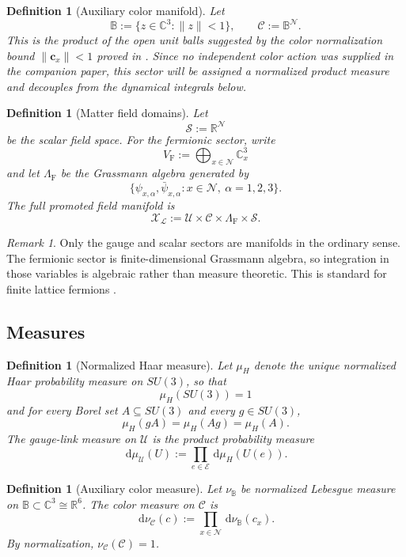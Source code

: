 \documentclass[11pt]{article}
\newtheorem{definition}[theorem]{Definition}
\theoremstyle{remark}
\newtheorem{remark}[theorem]{Remark}
\newcommand{\R}{\mathbb R}
\newcommand{\C}{\mathbb C}
\newcommand{\mcN}{\mathcal N}
\newcommand{\mcE}{\mathcal E}
\newcommand{\mcU}{\mathscr U}
\newcommand{\mcCaux}{\mathscr C}
\newcommand{\mcS}{\mathscr S}
\newcommand{\mcX}{\mathscr X}
\newcommand{\bbB}{\mathbb B}
\newcommand{\dd}{\,\mathrm d}
\begin{document}
\begin{definition}[Auxiliary color manifold]
\label{def:color-manifold}
Let
\[
\bbB:=\{z\in\C^3:\|z\|<1\},
\qquad
\mcCaux:=\bbB^{\mcN}.
\]
This is the product of the open unit balls suggested by the color normalization
bound $\|\mathbf c_x\|<1$ proved in \cite{continuumqft}.  Since no independent
color action was supplied in the companion paper, this sector will be assigned
a normalized product measure and decouples from the dynamical integrals below.
\end{definition}

\begin{definition}[Matter field domains]
\label{def:matter-domains}
Let
\[
\mcS:=\R^{\mcN}
\]
be the scalar field space.  For the fermionic sector, write
\[
V_{\mathrm F}:=\bigoplus_{x\in\mcN}\C_x^3
\]
and let $\Lambda_{\mathrm F}$ be the Grassmann algebra generated by
\[
\{\psi_{x,\alpha},\bar\psi_{x,\alpha}:x\in\mcN,\ \alpha=1,2,3\}.
\]
The full promoted field manifold is
\[
\mcX_\mathcal L:=\mcU\times\mcCaux\times \Lambda_{\mathrm F}\times\mcS.
\]
\end{definition}

\begin{remark}
Only the gauge and scalar sectors are manifolds in the ordinary sense.  The
fermionic sector is finite-dimensional Grassmann algebra, so integration in
those variables is algebraic rather than measure theoretic.  This is standard
for finite lattice fermions \cite{montvay1994quantum,rothe2012lattice}.
\end{remark}

\subsection{Measures}

\begin{definition}[Normalized Haar measure]
\label{def:haar}
Let $\mu_H$ denote the unique normalized Haar probability measure on $SU(3)$,
so that
\[
\mu_H(SU(3))=1
\]
and for every Borel set $A\subseteq SU(3)$ and every $g\in SU(3)$,
\[
\mu_H(gA)=\mu_H(Ag)=\mu_H(A).
\]
The gauge-link measure on $\mcU$ is the product probability measure
\[
\dd\mu_{\mcU}(U):=\prod_{e\in\mcE}\dd\mu_H(U(e)).
\]
\end{definition}

\begin{definition}[Auxiliary color measure]
\label{def:color-measure}
Let $\nu_{\bbB}$ be normalized Lebesgue measure on $\bbB\subset\C^3\cong\R^6$.
The color measure on $\mcCaux$ is
\[
\dd\nu_{\mcCaux}(c):=\prod_{x\in\mcN}\dd\nu_{\bbB}(c_x).
\]
By normalization, $\nu_{\mcCaux}(\mcCaux)=1$.
\end{definition}
\end{document}
